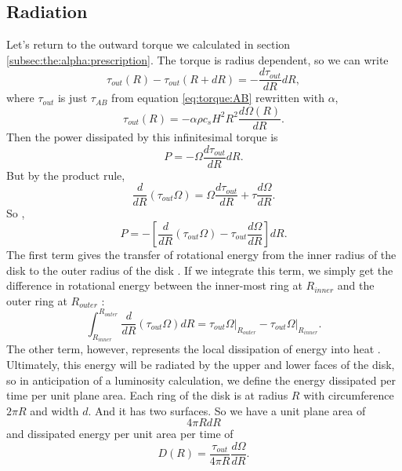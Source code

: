 \documentclass[]{article}
\newcommand{\eval}{\biggr\rvert} %
\newcommand{\dR}[1]{\frac{d #1}{dR}}
\newcommand{\ddR}{\frac{d}{dR}}
\begin{document}
\subsection{Radiation}
\label{subsec:radiation}

Let's return to the outward torque we calculated in section
\ref{subsec:the:alpha:prescription}. The torque is radius dependent,
so we can write \cite{Frank,Melia}
\begin{equation}
  \label{eq:d:tau}
  \tau_{out}(R) - \tau_{out}(R+dR) = - \dR{\tau_{out}}dR,
\end{equation}
where $\tau_{out}$ is just $\tau_{AB}$ from equation
\eqref{eq:torque:AB} rewritten with $\alpha$,
\begin{equation}
  \label{eq:tau:out}
  \tau_{out}(R) = -\alpha\rho c_s H^2 R^2 \dR{\Omega(R)}.
\end{equation}
Then the power dissipated by this infinitesimal torque is
\cite{Frank,Melia}
\begin{equation}
  \label{eq:power:dissipated}
  P = -\Omega \dR{\tau_{out}} dR.
\end{equation}
But by the product rule,
\begin{equation}
  \label{eq:product:rule:tau}
  \ddR(\tau_{out}\Omega) = \Omega \dR{\tau_{out}} + \tau \dR{\Omega}.
\end{equation}
So \cite{Melia}, 
\begin{equation}
  \label{eq:P:pieces}
  P = - \left[ \ddR (\tau_{out}\Omega) - \tau_{out}\dR{\Omega}\right]dR.
\end{equation}
The first term gives the transfer of rotational energy from the inner
radius of the disk to the outer radius of the disk \cite{Melia}. If we
integrate this term, we simply get the difference in rotational energy
between the inner-most ring at $R_{inner}$ and the outer ring at
$R_{outer}$ \cite{Melia}:
\begin{equation}
  \label{eq:difference:rotational:energy}
  \int_{R_{inner}}^{R_{outer}} \ddR(\tau_{out}\Omega)dR = \tau_{out}\Omega\eval_{R_{outer}} - \tau_{out}\Omega\eval_{R_{inner}}.
\end{equation}
The other term, however, represents the local dissipation of energy
into heat \cite{Melia}. Ultimately, this energy will be radiated by
the upper and lower faces of the disk, so in anticipation of a
luminosity calculation, we define the energy dissipated per time per
unit plane area. Each ring of the disk is at radius $R$ with
circumference $2\pi R$ and width $d$. And it has two surfaces. So we
have a unit plane area of
\begin{equation}
  \label{eq:unit:plane:area}
  4\pi R dR
\end{equation}
and dissipated energy per unit area per time of \cite{Frank,Melia}
\begin{equation}
  \label{eq:def:D(R)}
  D(R) = \frac{\tau_{out}}{4\pi R}\dR{\Omega}.
\end{equation}
\end{document}
